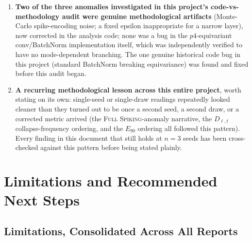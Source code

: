 \documentclass[11pt]{article}
\newcommand{\FullSpiking}{\textsc{Full Spiking}}
\begin{document}
\begin{enumerate}[leftmargin=1.8em]
{confirmatory result}: forbidden-mode energy is architecturally pinned near zero regardless of
configuration or seed, while allowed-mode amplitude (the learned component) varies substantially --- a
clean empirical separation of what the architecture guarantees from what training actually learns.
\item \textbf{Two of the three anomalies investigated in this project's code-vs-methodology audit were
genuine methodological artifacts} (Monte-Carlo spike-encoding noise; a fixed epsilon inappropriate for a
narrow layer), now corrected in the analysis code; none was a bug in the $p4$-equivariant conv/BatchNorm
implementation itself, which was independently verified to have no mode-dependent branching. The one
genuine historical code bug in this project (standard BatchNorm breaking equivariance) was found and
fixed before this audit began.
\item \textbf{A recurring methodological lesson across this entire project}, worth stating on its own:
single-seed or single-draw readings repeatedly looked cleaner than they turned out to be once a second
seed, a second draw, or a corrected metric arrived (the \FullSpiking-anomaly narrative, the
$D_{\ell,t}$ collapse-frequency ordering, and the $E_{90}$ ordering all followed this pattern). Every
finding in this document that still holds at $n{=}3$ seeds has been cross-checked against this pattern
before being stated plainly.
\end{enumerate}

\section{Limitations and Recommended Next Steps}
\label{sec:part11}

\subsection{Limitations, Consolidated Across All Reports}
\end{document}
